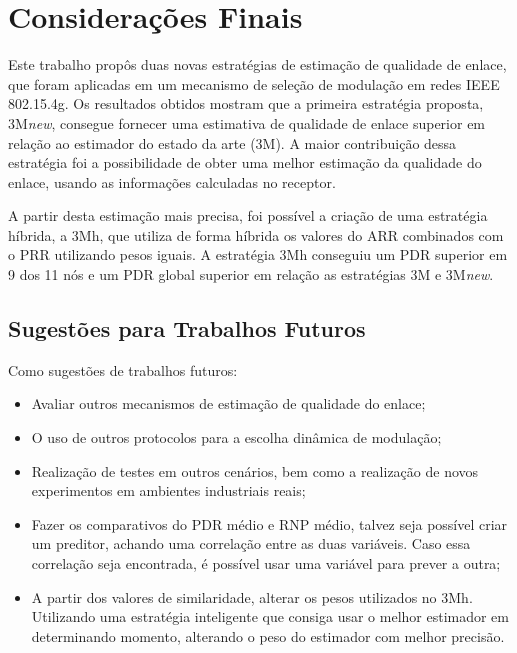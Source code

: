 \chapter{Considerações Finais}
\label{cap:conlusao}

Este trabalho propôs duas novas estratégias de estimação de qualidade de enlace, que foram aplicadas em um mecanismo de seleção de modulação em redes IEEE 802.15.4g. Os resultados obtidos mostram que a primeira estratégia proposta, 3M\textit{new}, consegue fornecer uma estimativa de qualidade de enlace superior em relação ao estimador do estado da arte (3M). A maior contribuição dessa estratégia foi a possibilidade de obter uma melhor estimação da qualidade do enlace, usando as informações calculadas no receptor. 

A partir desta estimação mais precisa, foi possível a criação de uma estratégia híbrida, a 3Mh, que utiliza de forma híbrida os valores do ARR combinados com o PRR utilizando pesos iguais. A estratégia 3Mh conseguiu um PDR superior em 9 dos 11 nós e um PDR global superior em relação as estratégias 3M e 3M\textit{new}. 

\section{Sugestões para Trabalhos Futuros}

Como sugestões de trabalhos futuros:
\begin{itemize}
    \item Avaliar outros mecanismos de estimação de qualidade do enlace;
    \item O uso de outros protocolos para a escolha dinâmica de modulação;
    \item Realização de testes em outros cenários, bem como a realização de novos experimentos em ambientes industriais reais;
    \item Fazer os comparativos do PDR médio e RNP médio, talvez seja possível criar um preditor, achando uma correlação entre as duas variáveis. Caso essa correlação seja encontrada, é possível usar uma variável para prever a outra;
    \item A partir dos valores de similaridade, alterar os pesos utilizados no 3Mh. Utilizando uma estratégia inteligente que consiga usar o melhor estimador em determinando momento, alterando o peso do estimador com melhor precisão.  
\end{itemize}


